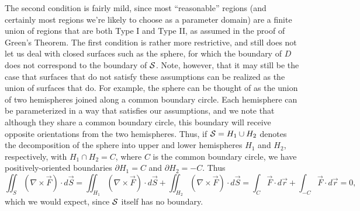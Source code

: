 The second condition is fairly mild, since most ``reasonable'' regions (and certainly most regions we're likely to choose as a parameter domain) are a finite union of regions that are both Type I and Type II, as assumed in the proof of Green's Theorem. The first condition is rather more restrictive, and still does not let us deal with closed surfaces such as the sphere, for which the boundary of $D$ does not correspond to the boundary of $\mathcal{S}$. Note, however, that it may still be the case that surfaces that do not satisfy these assumptions can be realized as the union of surfaces that do. For example, the sphere can be thought of as the union of two hemispheres joined along a common boundary circle. Each hemisphere can be parameterized in a way that satisfies our assumptions, and we note that although they share a common boundary circle, this boundary will receive opposite orientations from the two hemispheres. Thus, if $\mathcal{S}=H_1\cup H_2$ denotes the decomposition of the sphere into upper and lower hemispheres $H_
1$ and $H_2$, respectively, with $H_1\cap H_2 = C$, where $C$ is the common boundary circle, we have positively-oriented boundaries $\partial H_1 = C$ and $\partial H_2 = -C$. Thus
\[
 \iint_S (\nabla\times \vec{F})\cdot d\vec{S} = \iint_{H_1}(\nabla\times \vec{F})\cdot d\vec{S} + \iint_{H_2}(\nabla\times\vec{F})\cdot d\vec{S} = \int_C \vec{F}\cdot d\vec{r} + \int_{-C}\vec{F}\cdot d\vec{r} = 0,
\]
which we would expect, since $\mathcal{S}$ itself has no boundary.

